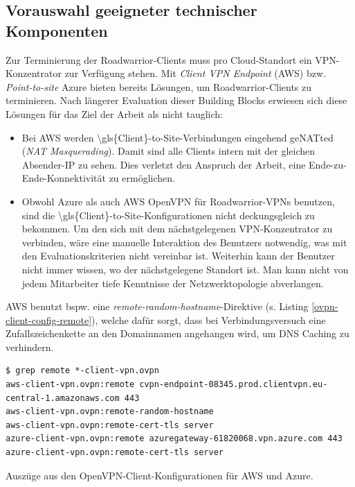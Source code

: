 \subsection{Vorauswahl geeigneter technischer Komponenten}\label{uc1-vorauswahl}
Zur Terminierung der \gls{Roadwarrior}-\gls{Client}s muss pro Cloud-Standort ein \gls{VPN-Konzentrator} zur Verfügung stehen. Mit \textit{\gls{Client} \gls{VPN} Endpoint} (AWS) bzw. \textit{Point-to-site} Azure bieten bereits Lösungen, um \gls{Roadwarrior}-\gls{Client}s zu terminieren. Nach längerer Evaluation dieser Building Blocks erwiesen sich diese Lösungen für das Ziel der Arbeit als nicht tauglich:
\begin{itemize}
\item Bei AWS werden \gls{\gls{Client}-to-Site}-Verbindungen eingehend ge\gls{NAT}ted (\textit{NAT Masquerading}). Damit sind alle \gls{Client}s intern mit der gleichen Absender-IP zu sehen. Dies verletzt den Anspruch der Arbeit, eine Ende-zu-Ende-Konnektivität zu ermöglichen.
\item Obwohl Azure als auch AWS OpenVPN für \gls{Roadwarrior}-\gls{VPN}s benutzen, sind die \gls{\gls{Client}-to-Site}-Konfigurationen nicht \glqq deckungsgleich\grqq{} zu bekommen. Um den sich mit dem nächstgelegenen \gls{VPN-Konzentrator} zu verbinden, wäre eine manuelle Interaktion des Benutzers notwendig, was mit den Evaluationskriterien nicht vereinbar ist. Weiterhin kann der Benutzer nicht immer wissen, wo der nächstgelegene Standort ist. Man kann nicht von jedem Mitarbeiter tiefe Kenntnisse der Netzwerktopologie abverlangen.
\end{itemize}
AWS benutzt bspw. eine \textit{remote-random-hostname}-Direktive (s. Listing \ref{ovpn-client-config-remote}), welche dafür sorgt, dass bei Verbindungsversuch eine Zufallszeichenkette an den Domainnamen angehangen wird, um \gls{DNS} Caching zu verhindern.
\begin{listing}[h]
\begin{verbatim}
$ grep remote *-client-vpn.ovpn
aws-client-vpn.ovpn:remote cvpn-endpoint-08345.prod.clientvpn.eu-central-1.amazonaws.com 443
aws-client-vpn.ovpn:remote-random-hostname
aws-client-vpn.ovpn:remote-cert-tls server
azure-client-vpn.ovpn:remote azuregateway-61820068.vpn.azure.com 443
azure-client-vpn.ovpn:remote-cert-tls server

\end{verbatim}
\caption{Auszüge aus den OpenVPN-\gls{Client}-Konfigurationen für AWS und Azure.}
\label{ovpn-client-config-remote}
\end{listing}\FloatBarrier

